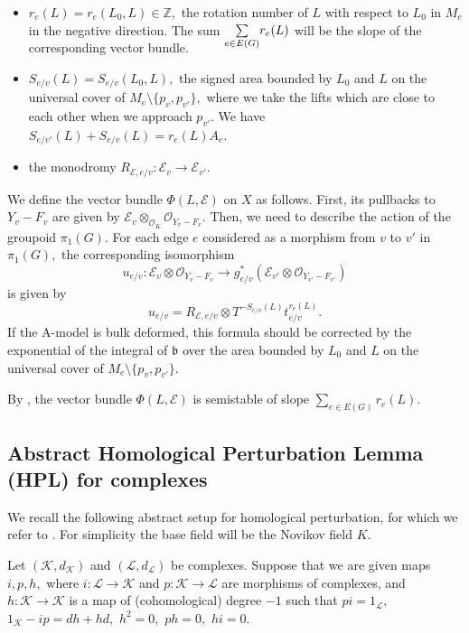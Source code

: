 \documentclass[11pt,leqno]{amsart}
\numberwithin{equation}{section}
\def\Z{\mathbb{Z}}
\newcommand{\cO}{{\mathcal O}}
\newcommand{\cL}{{\mathcal L}}
\newcommand{\cE}{{\mathcal E}}
\newcommand{\cK}{{\mathcal K}}
\begin{document}
\begin{itemize}
\item $r_e(L)=r_e(L_0,L)\in \Z,$ the rotation number of $L$ with respect to $L_0$ in $M_e$ in the negative direction. 
The sum $\smash{\sum\limits_{e\in E(G)}}r_e(L)$ will be the slope of the corresponding vector bundle.

\item $S_{e/v}(L)=S_{e/v}(L_0,L),$ the signed area bounded by $L_0$ and $L$ on the universal cover of 
$M_e\setminus\{p_v,p_{v'}\},$ where we take the lifts which are close to each other when we approach $p_{v'}.$ 
We have $S_{e/v'}(L)+S_{e/v}(L)=r_{e}(L)A_e.$

\item the monodromy $R_{\cE,e/v}:\cE_v\to\cE_{v'}.$
\end{itemize}

We define the vector bundle $\Phi(L,\cE)$ on $X$ as follows. First, its pullbacks to $Y_v-F_v$ are given by $\cE_v\otimes_{\cO_K}\cO_{Y_v-F_v}.$ Then, we need to describe the action of the groupoid $\pi_1(G).$ 
For each edge $e$ considered as a morphism from $v$ to $v'$ in $\pi_1(G),$ the corresponding isomorphism $$u_{e/v}:\cE_v\otimes\cO_{Y_v-F_v}\to g_{e/v}^*(\cE_{v'}\otimes\cO_{Y_{v'}-F_{v'}})$$ is given by 
\begin{equation}\label{eq:gluingdata} u_{e/v}=R_{\cE,e/v}\otimes T^{-S_{e/v}(L)}t_{e/v}^{r_e(L)}.\end{equation}
If the A-model is bulk deformed, this formula should be
corrected by the exponential of the integral of $\mathfrak{b}$ over the area
bounded by $L_0$ and $L$ on the universal cover of $M_e\setminus \{p_v,p_{v'}\}$.

By \cite{Fa}, the vector bundle $\Phi(L,\cE)$ is semistable of slope $\sum\limits_{e\in E(G)}r_e(L).$

\subsection{Abstract Homological Perturbation Lemma (HPL) for complexes}
\label{ss:HPL}

We recall the following abstract setup for homological perturbation, for which we refer to \cite{CL}. For simplicity the base field will be the Novikov field $K.$ 

Let $(\cK,d_{\cK})$ and $(\cL,d_{\cL})$ be complexes. Suppose that we are given  maps $i,p,h,$ where $i:\cL\to\cK$ and $p:\cK\to \cL$ are morphisms of complexes, and $h:\cK\to\cK$ is a map of (cohomological) degree $-1$ such that $pi=1_{\cL},$ $1_{\cK}-ip=dh+hd,$ $h^2=0,$ $ph=0,$ $hi=0.$ 
\end{document}

